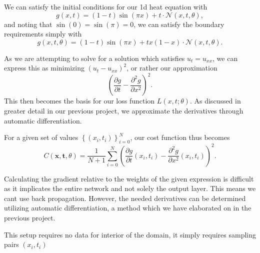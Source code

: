\documentclass{article}
\theoremstyle{definition}
\begin{document}
We can satisfy the initial conditions for our 1d heat equation with
\begin{equation*}
    g(x, t) = (1 - t) \sin(\pi x) + t \cdot \mathcal{N}(x, t, \theta),
\end{equation*}
and noting that $\sin(0) = \sin(\pi) = 0$, we can satisfy the boundary requirements simply with
\begin{equation*}
    g(x, t, \theta) = (1 - t) \sin(\pi x) + tx (1 - x) \cdot \mathcal{N}(x, t, \theta).
\end{equation*}

As we are attempting to solve for a solution which satisfies $u_t = u_{xx}$, we can express this as minimizing $\left(u_t - u_{xx}\right)^2$, or rather our approximation
\begin{equation*}
    \left( \frac{\partial g}{\partial t} - \frac{\partial^2 g}{\partial x^2} \right)^2.
\end{equation*}
This then becomes the basis for our loss function $L(x, t; \theta)$. As discussed in greater detail in our previous project, we approximate the derivatives through automatic differentiation.

For a given set of values $\left\{ (x_i, t_i) \right\}_{i=0}^{N}$, our cost function thus becomes
\begin{equation*}
    C(\boldsymbol{x}, \boldsymbol{t}, \theta) = \frac{1}{N + 1} \sum_{i=0}^N \left( \frac{\partial g}{\partial t}(x_i, t_i) - \frac{\partial^2 g}{\partial x^2}(x_i, t_i) \right)^2.
\end{equation*}

Calculating the gradient relative to the weights of the given expression is difficult as it implicates the entire network and not solely the output layer. This means we cant use back propagation. However, the needed derivatives can be determined utilizing automatic differentiation, a method which we have elaborated on in the previous project.

This setup requires no data for interior of the domain, it simply requires sampling pairs $(x_i, t_i)$

\end{document}
